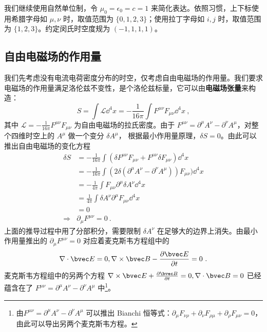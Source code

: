 

我们继续使用自然单位制，令 $\mu_0=\epsilon_0=c=1$ 来简化表达。依照习惯，上下标使用希腊字母如 $\mu, \nu$ 时，取值范围为 $\{0, 1, 2, 3\}$；使用拉丁字母如 $i, j$ 时，取值范围为 $\{1, 2, 3\}$。约定闵氏时空度规为 $(-1,1,1,1)$。

\subsection{自由电磁场的作用量}
我们先考虑没有电流电荷密度分布的时空，仅考虑自由电磁场的作用量。我们要求电磁场的作用量满足洛伦兹不变性，是个洛伦兹标量，它可以由\textbf{电磁场张量}来构造：
\begin{equation}\label{eq_ElecS_1}
S=\int {\mathcal L} {\dd}^4 x=-\frac{1}{16\pi}\int F^{\mu\nu}F_{\mu\nu}{\dd}^4 x ~,
\end{equation}
其中 $\mathcal L=-\frac{1}{16\pi}F^{\mu\nu}F_{\mu\nu}$ 为自由电磁场的拉氏密度。由于 $F^{\mu\nu}=\partial^\mu A^\nu -\partial^\nu A^\mu$，对整个四维时空上的 $A^\mu$ 做一个变分 $\delta A^\mu$，
根据最小作用量原理，$\delta S=0$。由此可以推出自由电磁场的变化方程
\begin{equation}
\begin{aligned}
\delta S&=-\frac{1}{16\pi}\int (\delta F^{\mu\nu}F_{\mu\nu}+F^{\mu\nu}\delta F_{\mu\nu}){\dd}^4 x\\
&=-\frac{1}{16\pi}\int (2\delta (\partial^\mu A^\nu-\partial^\nu A^\mu)) F_{\mu\nu}){\dd}^4 x\\
&=-\frac{1}{4\pi}\int F_{\mu\nu}\partial^\mu \delta A^\nu {\dd}^4 x\\
&=\frac{1}{4\pi}\int \delta A^\nu\partial^\mu F_{\mu\nu} {\dd}^4 x \\
&=0\\
\Rightarrow &\partial_\mu F^{\mu\nu}=0~.
\end{aligned}
\end{equation}
上面的推导过程中用了分部积分，需要限制 $\delta A^\nu$ 在足够大的边界上消失。由最小作用量推出的 $\partial_\mu F^{\mu\nu}=0$ 对应着麦克斯韦方程组中的
\begin{equation}
\nabla\cdot \bvec E=0,\nabla\times \bvec B-\frac{\partial \bvec E}{\partial t}=0~.
\end{equation}
麦克斯韦方程组中的另两个方程 $\nabla\times \bvec E+\frac{\partial \bvec B}{\partial t}=0,\nabla\cdot \bvec B=0$ 已经蕴含在了 $F^{\mu\nu}=\partial^\mu A^\nu-\partial^\nu A^\mu$ 中\footnote{由$F^{\mu\nu}=\partial^\mu A^\nu-\partial^\nu A^\mu$ 可以推出 Bianchi 恒等式：$\partial_{\mu}F_{\nu\rho}+\partial_{\nu}F_{\rho\mu}+\partial_{\rho}F_{\mu\nu}=0$，由此可以导出另两个麦克斯韦方程。}。

